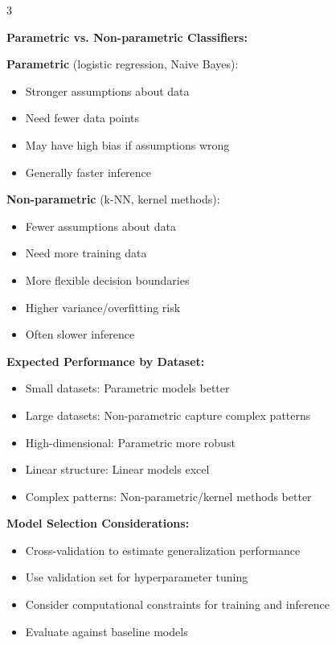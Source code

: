 \documentclass[10pt,landscape]{article}
\begin{document}
\begin{multicols}{3}
\begin{tcolorbox}[breakable, title=2.5 Classifier Performance Analysis, colback=classification]
\textbf{Parametric vs. Non-parametric Classifiers:}

\textbf{Parametric} (logistic regression, Naive Bayes):
\begin{itemize}[leftmargin=*,noitemsep,topsep=0pt]
    \item Stronger assumptions about data
    \item Need fewer data points
    \item May have high bias if assumptions wrong
    \item Generally faster inference
\end{itemize}

\textbf{Non-parametric} (k-NN, kernel methods):
\begin{itemize}[leftmargin=*,noitemsep,topsep=0pt]
    \item Fewer assumptions about data
    \item Need more training data
    \item More flexible decision boundaries
    \item Higher variance/overfitting risk
    \item Often slower inference
\end{itemize}

\textbf{Expected Performance by Dataset:}
\begin{itemize}[leftmargin=*,noitemsep,topsep=0pt]
    \item Small datasets: Parametric models better
    \item Large datasets: Non-parametric capture complex patterns
    \item High-dimensional: Parametric more robust
    \item Linear structure: Linear models excel
    \item Complex patterns: Non-parametric/kernel methods better
\end{itemize}

\textbf{Model Selection Considerations:}
\begin{itemize}[leftmargin=*,noitemsep,topsep=0pt]
    \item Cross-validation to estimate generalization performance
    \item Use validation set for hyperparameter tuning
    \item Consider computational constraints for training and inference
    \item Evaluate against baseline models
\end{itemize}
\end{tcolorbox}


\end{multicols}
\end{document}

